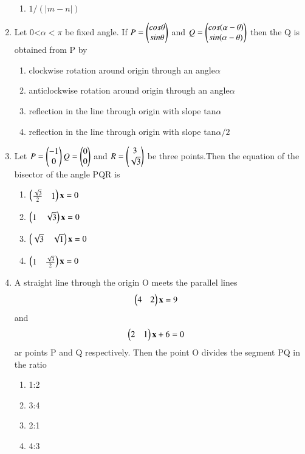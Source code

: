 \begin{enumerate}
\begin{enumerate}
     \item $1/(\vert m-n\vert)$ 
    \end{enumerate}
    \item Let 0\textless$\alpha<\pi$  be fixed angle. If
    $P=\begin{pmatrix}cos\theta\\sin\theta\end{pmatrix}$ and $Q=\begin{pmatrix}cos(\alpha-\theta)\\sin(\alpha-\theta)\end{pmatrix}$
    then the Q is obtained from P by
    \begin{enumerate}
     \item  clockwise rotation around origin through an angle$\alpha$
     \item  anticlockwise rotation around origin through an angle$\alpha$
     \item  reflection in the line through origin with slope tan$\alpha$
     \item  reflection in the line through origin with slope tan$\alpha/2$
     \end{enumerate}
    \item Let $P=\begin{pmatrix}-1\\0\end{pmatrix} Q=\begin{pmatrix}0\\0\end{pmatrix}$ and $R=\begin{pmatrix}3\\\sqrt3\end{pmatrix}$ be three points.Then the equation of the bisector of the angle PQR is
    \begin{enumerate}
     \item $\begin{pmatrix}{\frac{\sqrt3}{2}} & 1\end{pmatrix} \mathbf x= 0$
     \item $\begin{pmatrix}1 & \sqrt3\end{pmatrix} \mathbf x= 0$
     \item $\begin{pmatrix}\sqrt3 & \sqrt1\end{pmatrix} \mathbf x= 0$
     \item $\begin{pmatrix}1 & \frac{\sqrt3}{2}\end{pmatrix} \mathbf x= 0$
     \end{enumerate}
    \item A straight line through the origin O meets the parallel lines \begin{align} \begin{pmatrix}4 & 2\end{pmatrix} \mathbf {x} &= 9\end{align} and \begin{align} \begin{pmatrix}2 & 1\end{pmatrix} \mathbf {x} + 6 &= 0\end{align} ar points P and Q respectively. Then the point O divides the segment PQ in the ratio
    \begin{enumerate}
     \item 1:2
     \item 3:4
     \item  2:1
     \item 4:3
     \end{enumerate}

\end{enumerate}
